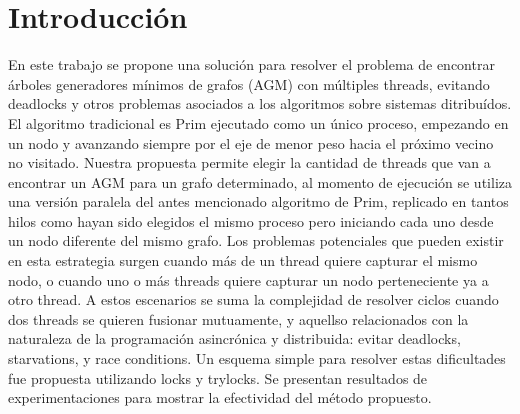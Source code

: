\section{Introducción}
En este trabajo se propone una solución para resolver el problema de encontrar árboles generadores mínimos de grafos (AGM) con múltiples threads, evitando deadlocks y otros problemas asociados a los algoritmos sobre sistemas ditribuídos. El algoritmo tradicional es Prim ejecutado como un único proceso, empezando en un nodo y avanzando siempre por el eje de menor peso hacia el próximo vecino no visitado. Nuestra propuesta permite elegir la cantidad de threads que van a encontrar un AGM para un grafo determinado, al momento de ejecución se utiliza una versión paralela del antes mencionado algoritmo de Prim, replicado en tantos hilos como hayan sido elegidos el mismo proceso pero iniciando cada uno desde un nodo diferente del mismo grafo. Los problemas potenciales que pueden existir en esta estrategia surgen cuando más de un thread quiere capturar el mismo nodo, o cuando uno o más threads quiere capturar un nodo perteneciente ya a otro thread. A estos escenarios se suma la complejidad de resolver ciclos cuando dos threads se quieren fusionar mutuamente, y aquellso relacionados con la naturaleza de la programación asincrónica y distribuida: evitar deadlocks, starvations, y race conditions. Un esquema simple para resolver estas dificultades fue propuesta utilizando locks y trylocks. Se presentan resultados de experimentaciones para mostrar la efectividad del método propuesto.




